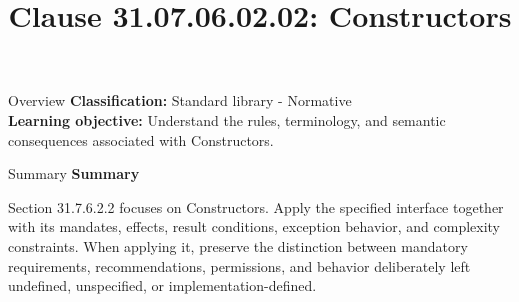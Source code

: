\documentclass[10pt,letterpaper]{article}
\title{Clause 31.07.06.02.02: Constructors}
\author{}
\date{}
\begin{document}
\maketitle
\begin{CornellOverviewBox}{Overview}
\textbf{Classification:} Standard library - Normative\\[2pt]
\textbf{Learning objective:} Understand the rules, terminology, and semantic consequences associated with Constructors.
\end{CornellOverviewBox}\begin{CornellSummaryBox}{Summary}
{\sffamily\bfseries\color{Accent} Summary}\par\vspace{3pt}Section 31.7.6.2.2 focuses on Constructors. Apply the specified interface together with its mandates, effects, result conditions, exception behavior, and complexity constraints. When applying it, preserve the distinction between mandatory requirements, recommendations, permissions, and behavior deliberately left undefined, unspecified, or implementation-defined.
\end{CornellSummaryBox}
\end{document}
